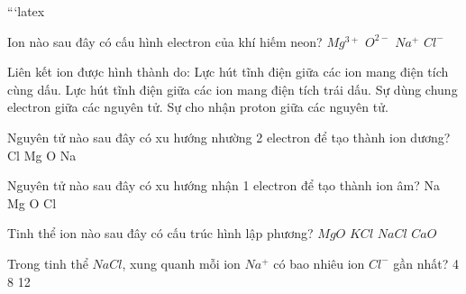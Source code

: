 ```latex
\begin{ex}
Ion nào sau đây có cấu hình electron của khí hiếm neon?
    \choice
    {$Mg^{3+}$}
    {\True $O^{2-}$}
    {$Na^+$}
    {$Cl^-$}
\end{ex}

\begin{ex}
Liên kết ion được hình thành do:
    \choice
    {Lực hút tĩnh điện giữa các ion mang điện tích cùng dấu.}
    {\True Lực hút tĩnh điện giữa các ion mang điện tích trái dấu.}
    {Sự dùng chung electron giữa các nguyên tử.}
    {Sự cho nhận proton giữa các nguyên tử.}
\end{ex}

\begin{ex}
Nguyên tử nào sau đây có xu hướng nhường 2 electron để tạo thành ion dương?
    \choice
    {Cl}
    {\True Mg}
    {O}
    {Na}
\end{ex}

\begin{ex}
Nguyên tử nào sau đây có xu hướng nhận 1 electron để tạo thành ion âm?
    \choice
    {Na}
    {Mg}
    {O}
    {\True Cl}
\end{ex}

\begin{ex}
Tinh thể ion nào sau đây có cấu trúc hình lập phương?
    \choice
    {$MgO$}
    {$KCl$}
    {\True $NaCl$}
    {$CaO$}
\end{ex}

\begin{ex}
Trong tinh thể $NaCl$, xung quanh mỗi ion $Na^+$ có bao nhiêu ion $Cl^-$ gần nhất?
    \choice
    {4}
    {}
    {8}
    {12}
\end{ex}

